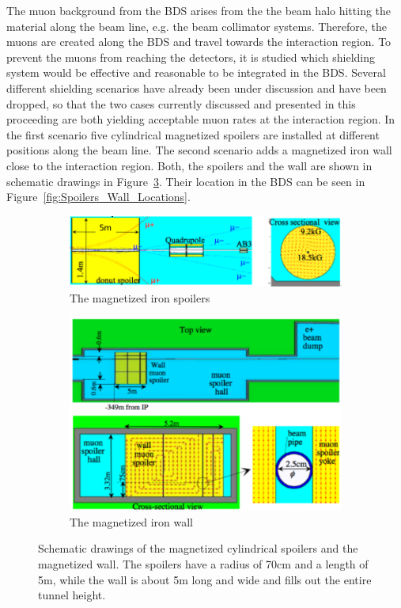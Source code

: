\documentclass[12pt]{article}
\begin{document}
The muon background from the BDS arises from the the beam halo hitting the material along the beam line, e.g. the beam collimator systems.
Therefore, the muons are created along the BDS and travel towards the interaction region.
To prevent the muons from reaching the detectors, it is studied which shielding system would be effective and reasonable to be integrated in the BDS.
Several different shielding scenarios have already been under discussion and have been dropped, so that the two cases currently discussed and presented in this proceeding are both yielding acceptable muon rates at the interaction region.
In the first scenario five cylindrical magnetized spoilers are installed at different positions along the beam line.
The second scenario adds a magnetized iron wall close to the interaction region.
Both, the spoilers and the wall are shown in schematic drawings in Figure~\ref{fig:Spoilers_Wall}.
Their location in the BDS can be seen in Figure~\ref{fig:Spoilers_Wall_Locations}.
\begin{figure}
    \centering
    \begin{subfigure}[b]{0.53\textwidth}
        \includegraphics[width=\textwidth]{figures/Spoiler.png}
        \caption{The magnetized iron spoilers}
	\label{fig:spoilers}
    \end{subfigure}
    \begin{subfigure}[b]{0.42\textwidth}
        \includegraphics[width=\textwidth]{figures/Muon_wall.pdf}
        \caption{The magnetized iron wall}
        \label{fig:wall}
    \end{subfigure}
    \caption[Schematic drawings of the shielding systems]{
    Schematic drawings of the magnetized cylindrical spoilers and the magnetized wall.
    The spoilers have a radius of \unit{70}{cm} and a length of \unit{5}{m}, while the wall is about \unit{5}{m} long and wide and fills out the entire tunnel height.
    }
    \label{fig:Spoilers_Wall}
\end{figure}
\end{document}
